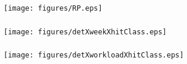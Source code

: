 \documentclass[aspectratio=43, notes]{beamer}
\begin{document}






\begin{frame}
\frametitle{}
\begin{figure}
	\centering
	\texttt{[image: figures/RP.eps]}
	\label{fig:RP}
\end{figure}
\end{frame}




\begin{frame}
\frametitle{}
\begin{figure}
	\centering
	\texttt{[image: figures/detXweekXhitClass.eps]}
	\label{fig:dweekHitclass}
\end{figure}
\end{frame}


\begin{frame}
\frametitle{}
\begin{figure}
\centering
\texttt{[image: figures/detXworkloadXhitClass.eps]}
\label{fig:dworkloadHitclass}
\end{figure}
\end{frame}

\begin{frame}
\begin{figure}
	\label{fig:tmetrics}
\end{figure}
\end{frame}
\end{document}
